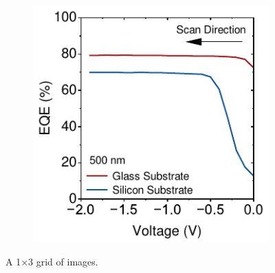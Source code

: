 \begin{figure}[htbp]
\begin{subfigure}{0.32\textwidth}
        \caption{}
        \label{fig:ch2:eqe_comp_pix_glass}
    \end{subfigure}
    \hfill
    \begin{subfigure}{0.32\textwidth}
        \centering
        \includegraphics[width=\textwidth]{chapters/material_properties/images/EQE_fV_PIX_Glass.pdf}
        \caption{}
        \label{fig:plot3}
    \end{subfigure}
    
    \caption{A 1×3 grid of images.}
    \label{fig:ch2:eqefV_comp_pix_glass}
\end{figure}


